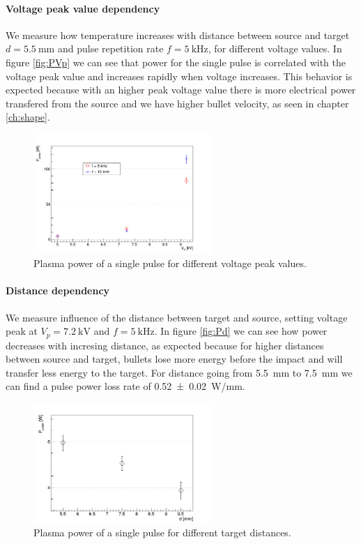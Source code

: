 \paragraph{Voltage peak value dependency}
We measure how temperature increases with distance between source and target $d = \SI{5.5}{\milli\meter}$ and pulse repetition rate $f = \SI{5}{\kilo\hertz}$, for different voltage values. In figure \ref{fig:PVp} we can see that power for the single pulse is correlated with the voltage peak value and increases rapidly when voltage increases. This behavior is expected because with an higher peak voltage value there is more electrical power transfered from the source and we have higher bullet velocity, as seen in chapter \ref{ch:shape}.
\begin{figure}
 \centering
 \includegraphics[width=0.6\textwidth]{Images/Temperature/Ppulse_Vp.png}
 \caption{Plasma power of a single pulse for different voltage peak values.}
\end{figure}

\paragraph{Distance dependency}
We measure influence of the distance between target and source, setting voltage peak at $V_{p} = \SI{7.2}{\kilo\volt}$ and $f = \SI{5}{\kilo\hertz}$. In figure \ref{fig:Pd} we can see how power decreases with incresing distance, as expected because for higher distances between source and target, bullets lose more energy before the impact and will transfer less energy to the target. For distance going from \SI{5.5}{\milli\meter} to \SI{7.5}{\milli\meter} we can find a pulse power loss rate of \SI{0.52(2)}{\watt/\milli\meter}.
\begin{figure}
 \centering
 \includegraphics[width=0.6\textwidth]{Images/Temperature/Ppulse_d.png}
 \caption{Plasma power of a single pulse for different target distances.}
\end{figure}
